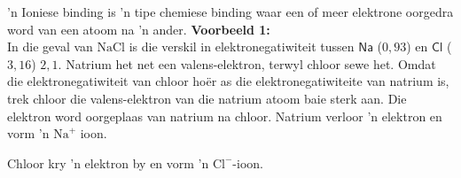 \label{m38684*fhsst!!!underscore!!!id456}
 { 'n Ioniese binding is 'n tipe chemiese binding waar een of meer elektrone oorgedra word van een atoom na   'n ander.} 
        \label{m38684*id142248}
          \textbf{Voorbeeld 1:}\\
In die geval van $\text{NaCl}$ is die verskil in elektronegatiwiteit tussen $\textsf{Na}$ ($0,93$) en $\textsf{Cl}$ ($3,16$)  $2,1$. Natrium het net een valens-elektron, terwyl chloor sewe het. Omdat die elektronegatiwiteit
van chloor hoër as die elektronegatiwiteite van natrium is,  trek chloor die valens-elektron
van die natrium atoom baie sterk aan. Die elektron word oorgeplaas van natrium na chloor. Natrium
verloor  'n elektron en vorm  'n ${\text{Na}}^{+}$ ioon.\\
  \par
Chloor kry   'n elektron by en vorm  'n ${\text{Cl}}^{-}$-ioon. \\
  \par

